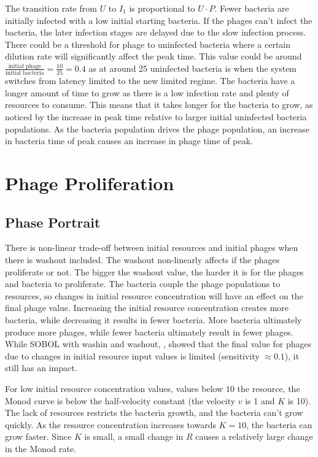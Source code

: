 The transition rate from $U$ to $I_1$ is proportional to $U\cdot P$. 
Fewer bacteria are initially infected with a low initial starting bacteria. 
If the phages can't infect the bacteria, the later infection stages are delayed due to the slow infection process. 
There could be a threshold for phage to uninfected bacteria where a certain dilution rate will significantly affect the peak time. 
This value could be around $\frac{\text{initial phage}}{\text{initial bacteria}} = \frac{10}{25} = 0.4$ as at around 25 uninfected bacteria is when the system switches from latency limited to the new limited regime. 
The bacteria have a longer amount of time to grow as there is a low infection rate and plenty of resources to consume. 
This means that it takes longer for the bacteria to grow, as noticed by the increase in peak time relative to larger initial uninfected bacteria populations. 
As the bacteria population drives the phage population, an increase in bacteria time of peak causes an increase in phage time of peak. 

\section{Phage Proliferation}
\subsection{Phase Portrait}
There is non-linear trade-off between initial resources and initial phages when there is washout included. 
The washout non-linearly affects if the phages proliferate or not. 
The bigger the washout value, the harder it is for the phages and bacteria to proliferate. 
The bacteria couple the phage populations to resources, so changes in initial resource concentration will have an effect on the final phage value. 
Increasing the initial resource concentration creates more bacteria, while decreasing it results in fewer bacteria.
More bacteria ultimately produce more phages, while fewer bacteria ultimately result in fewer phages.
While SOBOL with washin and washout, , showed that the final value for phages due to changes in initial resource input values is limited (sensitivity $\approx 0.1$), it still has an impact. 

For low initial resource concentration values, values below $10$ the resource, the Monod curve is below the half-velocity constant (the velocity $v$ is 1 and $K$ is 10). 
The lack of resources restricts the bacteria growth, and the bacteria can't grow quickly. 
As the resource concentration increases towards $K=10$, the bacteria can grow faster. 
Since $K$ is small, a small change in $R$ causes a relatively large change in the Monod rate. 

